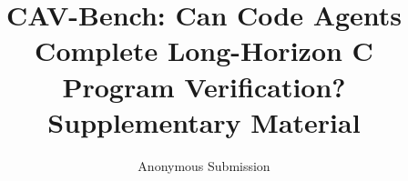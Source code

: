 \documentclass[letterpaper]{article}
\title{CAV-Bench: Can Code Agents Complete Long-Horizon C Program Verification?\\
Supplementary Material}
\author{
Anonymous Submission
}
\begin{document}
\maketitle

\appendix
\renewcommand{\thealgorithm}{A\arabic{algorithm}}
\setcounter{algorithm}{0}


\newpage

\end{document}

